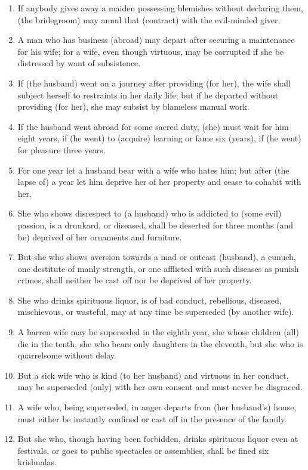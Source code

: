 \begin{enumerate}
\item If anybody gives away a maiden possessing blemishes without declaring them, (the bridegroom) may annul that (contract) with the evil-minded giver.
\item A man who has business (abroad) may depart after securing a maintenance for his wife; for a wife, even though virtuous, may be corrupted if she be distressed by want of subsistence.
\item If (the husband) went on a journey after providing (for her), the wife shall subject herself to restraints in her daily life; but if he departed without providing (for her), she may subsist by blameless manual work.
\item If the husband went abroad for some sacred duty, (she) must wait for him eight years, if (he went) to (acquire) learning or fame six (years), if (he went) for pleasure three years.
\item For one year let a husband bear with a wife who hates him; but after (the lapse of) a year let him deprive her of her property and cease to cohabit with her.
\item She who shows disrespect to (a husband) who is addicted to (some evil) passion, is a drunkard, or diseased, shall be deserted for three months (and be) deprived of her ornaments and furniture.
\item But she who shows aversion towards a mad or outcast (husband), a eunuch, one destitute of manly strength, or one afflicted with such diseases as punish crimes, shall neither be cast off nor be deprived of her property.
\item She who drinks spirituous liquor, is of bad conduct, rebellious, diseased, mischievous, or wasteful, may at any time be superseded (by another wife).
\item A barren wife may be superseded in the eighth year, she whose children (all) die in the tenth, she who bears only daughters in the eleventh, but she who is quarrelsome without delay.
\item But a sick wife who is kind (to her husband) and virtuous in her conduct, may be superseded (only) with her own consent and must never be disgraced.
\item A wife who, being superseded, in anger departs from (her husband's) house, must either be instantly confined or cast off in the presence of the family.
\item But she who, though having been forbidden, drinks spirituous liquor even at festivals, or goes to public spectacles or assemblies, shall be fined six krishnalas.

\end{enumerate}
